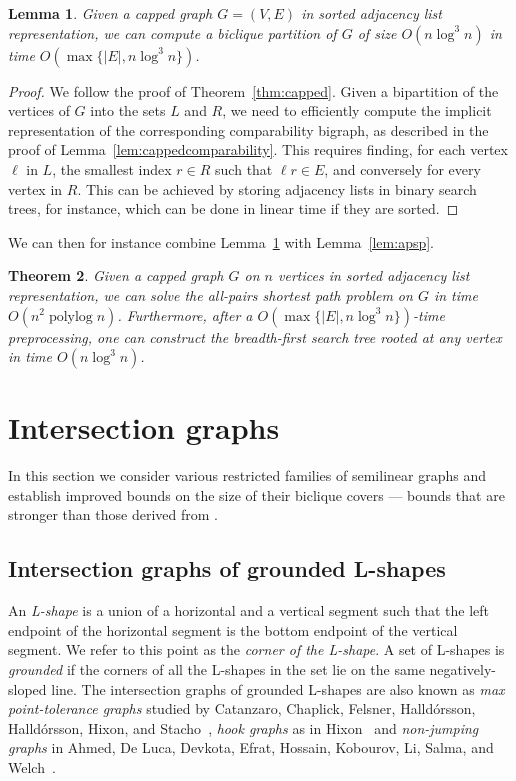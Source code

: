 \documentclass{amsart}
\newtheorem{theorem}{Theorem}%
\newtheorem{lemma}[theorem]{Lemma}
\newcommand{\darkblue}{\color{darkblue}} %
\newcommand{\defn}[1]{\textsl{\darkblue #1}} %
\DeclareMathOperator{\polylog}{\mathrm{polylog}}
\begin{document}
\begin{lemma}
\label{lem:comcap}
    Given a capped graph $G=(V,E)$ in sorted adjacency list representation, we can compute a biclique partition of $G$ of size $O(n\log^3 n)$ in time $O(\max\{ |E|, n\log^3 n\})$.
\end{lemma}
\begin{proof}
    We follow the proof of Theorem~\ref{thm:capped}. Given a bipartition of the vertices of $G$ into the sets $L$ and $R$, we need to efficiently compute the implicit representation of the corresponding comparability bigraph, as described in the proof of Lemma~\ref{lem:cappedcomparability}. This requires finding, for each vertex $\ell$ in $L$, the smallest index $r\in R$ such that $\ell r\in E$, and conversely for every vertex in $R$.
    This can be achieved by storing adjacency lists in binary search trees, for instance, which can be done in linear time if they are sorted.  
\end{proof}

We can then for instance combine Lemma~\ref{lem:comcap} with Lemma~\ref{lem:apsp}.

\begin{theorem}
    Given a capped graph $G$ on $n$ vertices in sorted adjacency list representation, we can solve the all-pairs shortest path problem on $G$ in time $O(n^2\polylog n)$.
    Furthermore, after a $O(\max\{ |E|, n\log^3 n\})$-time preprocessing, one can construct the breadth-first search tree rooted at any vertex in time $O(n\log^3 n)$.
\end{theorem}


\section{Intersection graphs}
\label{sec:intersection}

In this section we consider various restricted families of semilinear graphs and establish improved bounds on the size of their biclique covers — bounds that are stronger than those derived from .

\subsection{Intersection graphs of grounded L-shapes}
 
An \defn{L-shape} is a union of a horizontal and a vertical segment such that the left endpoint of the horizontal segment is the bottom endpoint of the vertical segment. We refer to this point as the \defn{corner of the L-shape}. A set of L-shapes is \defn{grounded} if the corners of all the L-shapes in the set lie on the same negatively-sloped line.
The intersection graphs of grounded L-shapes are also known as \defn{max point-tolerance graphs} studied by Catanzaro, Chaplick, Felsner, Halld\'{o}rsson,
Halld\'{o}rsson, Hixon, and Stacho~\cite{CCFHHHS17}, \defn{hook graphs} as in Hixon~\cite{hixon2013hook} and \defn{non-jumping graphs} in Ahmed, De Luca, Devkota, Efrat, Hossain, Kobourov, Li, Salma, and Welch~\cite{ahmed2017graphs}. 
\end{document}
